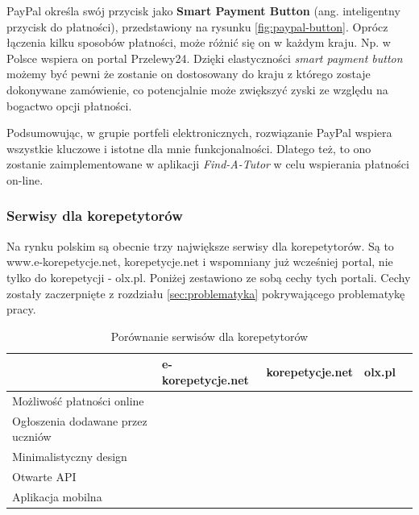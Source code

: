 \documentclass[12pt]{article}
\newcommand{\cmark}{\textcolor{green!80!black}{\ding{51}}}
\newcommand{\xmark}{\textcolor{red}{\ding{55}}}
\numberwithin{figure}{section}
\begin{document}
\begin{sloppypar}
PayPal określa swój przycisk jako \textbf{Smart Payment Button} (ang. 
inteligentny przycisk do płatności), przedstawiony na rysunku \ref{fig:paypal-button}. Oprócz łączenia kilku sposobów płatności, może różnić się on w każdym kraju. Np. w Polsce wspiera on portal Przelewy24. Dzięki elastyczności \textit{smart payment button} możemy być pewni że zostanie on dostosowany do kraju z którego zostaje dokonywane zamówienie, co potencjalnie może zwiększyć zyski ze względu na bogactwo opcji płatności. 

Podsumowując, w grupie portfeli elektronicznych, rozwiązanie PayPal wspiera wszystkie kluczowe i istotne dla mnie funkcjonalności. Dlatego też, to ono zostanie zaimplementowane w aplikacji \textit{Find-A-Tutor} w celu wspierania płatności on-line.

\subsubsection{Serwisy dla korepetytorów}
Na rynku polskim są obecnie trzy największe serwisy dla korepetytorów. Są to www.e-korepetycje.net, 
korepetycje.net i wspomniany już wcześniej portal, nie tylko do korepetycji - olx.pl. Poniżej zestawiono ze sobą cechy tych portali. Cechy zostały zaczerpnięte z rozdziału \ref{sec:problematyka} pokrywającego problematykę pracy.

\begin{table}[H]
    \begin{tabular}{|p{5cm}|c|c|c|c|}
    \hline
     & \multicolumn{1}{l|}{e-korepetycje.net} & \multicolumn{1}{l|}{korepetycje.net} & \multicolumn{1}{l|}{olx.pl} \\ \hline
    Możliwość płatności online & \xmark & \xmark & \xmark \\ \hline
    Ogłoszenia dodawane przez uczniów & \cmark & \xmark & \cmark \\ \hline
    Minimalistyczny design & \cmark & \xmark & \xmark \\ \hline
    Otwarte API & \xmark & \xmark & \xmark \\ \hline
    Aplikacja mobilna & \xmark & \xmark & \cmark \\ \hline
    \end{tabular}
    \caption{Porównanie serwisów dla korepetytorów}
    \label{tab:korepetycje}
\end{table}


\end{sloppypar}
\end{document}
